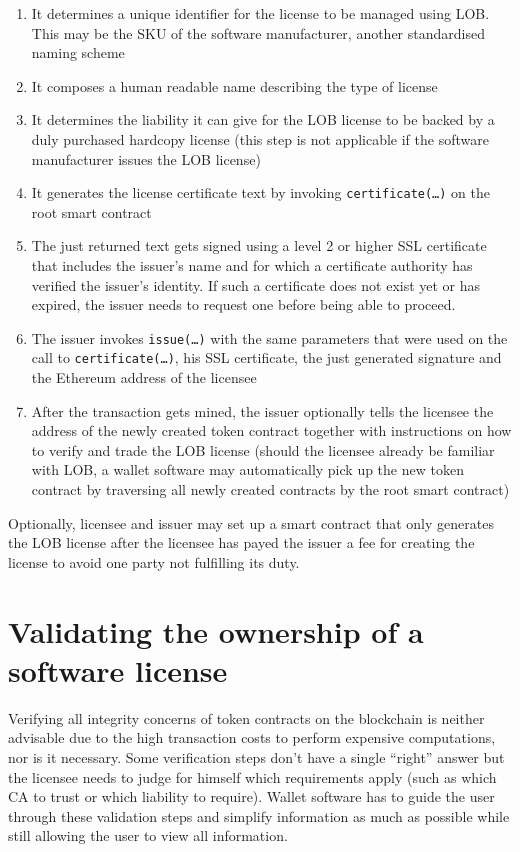 \documentclass[a4paper]{article}
\begin{document}
\begin{enumerate}
  \item It determines a unique identifier for the license to be managed using LOB. This may be the SKU of the software manufacturer, another standardised naming scheme
  \item It composes a human readable name describing the type of license
  \item It determines the liability it can give for the LOB license to be backed by a duly purchased hardcopy license (this step is not applicable if the software manufacturer issues the LOB license)
  \item It generates the license certificate text by invoking \texttt{certificate(…)} on the root smart contract
  \item The just returned text gets signed using a level 2 or higher SSL certificate that includes the issuer's name and for which a certificate authority has verified the issuer's identity. If such a certificate does not exist yet or has expired, the issuer needs to request one before being able to proceed.
  \item The issuer invokes \texttt{issue(…)} with the same parameters that were used on the call to \texttt{certificate(…)}, his SSL certificate, the just generated signature and the Ethereum address of the licensee
  \item After the transaction gets mined, the issuer optionally tells the licensee the address of the newly created token contract together with instructions on how to verify and trade the LOB license (should the licensee already be familiar with LOB, a wallet software may automatically pick up the new token contract by traversing all newly created contracts by the root smart contract)
\end{enumerate}

Optionally, licensee and issuer may set up a smart contract that only generates the LOB license after the licensee has payed the issuer a fee for creating the license to avoid one party not fulfilling its duty.

\section{Validating the ownership of a software license}

Verifying all integrity concerns of token contracts on the blockchain is neither advisable due to the high transaction costs to perform expensive computations, nor is it necessary. Some verification steps don't have a single “right” answer but the licensee needs to judge for himself which requirements apply (such as which CA to trust or which liability to require). Wallet software has to guide the user through these validation steps and simplify information as much as possible while still allowing the user to view all information.
\end{document}
